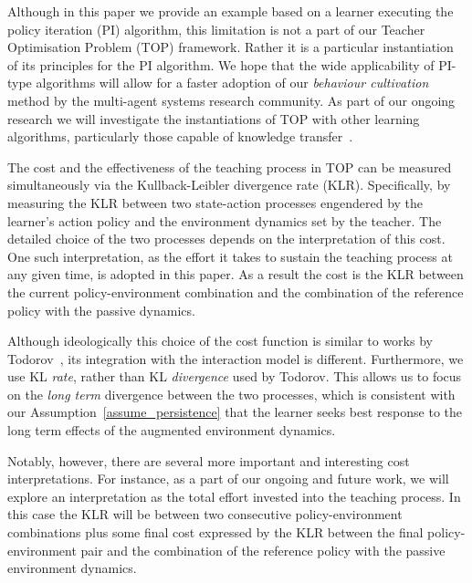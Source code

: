 Although in this paper we provide an example based on a learner
executing the policy iteration (PI) algorithm, this limitation is not
a part of our Teacher Optimisation Problem (TOP) framework. Rather it
is a particular instantiation of its principles for the PI
algorithm. We hope that the wide applicability of PI-type algorithms
will allow for a faster adoption of our {\em behaviour cultivation}
method by the multi-agent systems research community. As part of our
ongoing research we will investigate the instantiations of TOP with
other learning algorithms, particularly those capable of knowledge
transfer~\cite{taylor_stone_2009,taylor_PhD_2008}.

The cost and the effectiveness of the teaching process in TOP can be
measured simultaneously via the Kullback-Leibler divergence rate
(KLR). Specifically, by measuring the KLR between two state-action
processes engendered by the learner's action policy and the
environment dynamics set by the teacher. The detailed choice of the
two processes depends on the interpretation of this cost. One such
interpretation, as the effort it takes to sustain the teaching process
at any given time, is adopted in this paper. As a result the cost is
the KLR between the current policy-environment combination and the
combination of the reference policy with the passive dynamics.

Although ideologically this choice of the cost function is similar to
works by
Todorov~\cite{todorov_2009_framework,todorov_2009_framework_sup}, its
integration with the interaction model is different. Furthermore, we
use KL {\em rate}, rather than KL {\em divergence} used by
Todorov. This allows us to focus on the {\em long term} divergence
between the two processes, which is consistent with our
Assumption~\ref{assume_persistence} that the learner seeks best
response to the long term effects of the augmented environment
dynamics.

Notably, however, there are several more important and interesting
cost interpretations. For instance, as a part of our ongoing and
future work, we will explore an interpretation as the total effort invested
into the teaching process. In this case the KLR will be between two
consecutive policy-environment combinations plus some final cost
expressed by the KLR between the final policy-environment pair and the
combination of the reference policy with the passive environment
dynamics.

